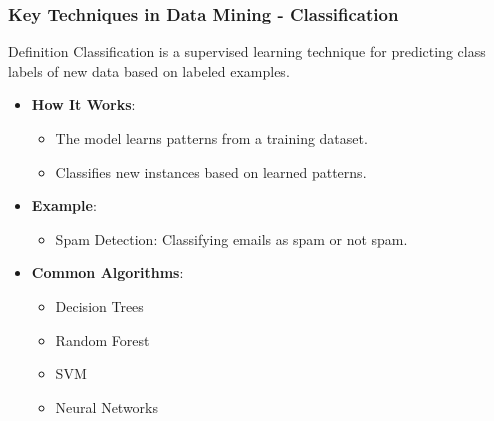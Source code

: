 \documentclass[aspectratio=169]{beamer}
\begin{document}
\begin{frame}[fragile]
    \frametitle{Key Techniques in Data Mining - Classification}
    \begin{block}{Definition}
        Classification is a supervised learning technique for predicting class labels of new data based on labeled examples.
    \end{block}
    \begin{itemize}
        \item \textbf{How It Works}:
        \begin{itemize}
            \item The model learns patterns from a training dataset.
            \item Classifies new instances based on learned patterns.
        \end{itemize}
        \item \textbf{Example}:
            \begin{itemize}
                \item Spam Detection: Classifying emails as spam or not spam.
            \end{itemize}
        \item \textbf{Common Algorithms}:
            \begin{itemize}
                \item Decision Trees
                \item Random Forest
                \item SVM
                \item Neural Networks
            \end{itemize}
\end{itemize}
\end{frame}
\end{document}
